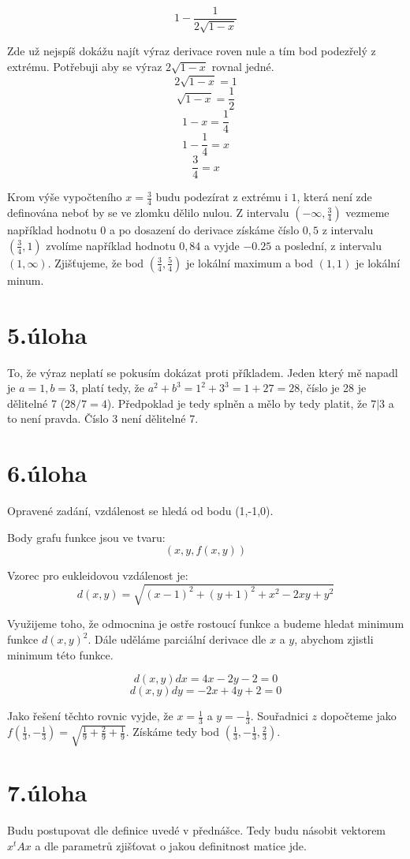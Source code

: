 \documentclass[a4paper, 11pt]{article}
\begin{document}
   $$1-\frac{1}{2\sqrt{1-x}}$$
   
   Zde už nejspíš dokážu najít výraz derivace roven nule a tím bod podezřelý z extrému. Potřebuji aby se výraz $2\sqrt{1-x}$ rovnal jedné.
   $$2\sqrt{1-x} = 1$$
   $$\sqrt{1-x} = \frac{1}{2}$$
   $$ 1-x = \frac{1}{4}$$
   $$1-\frac{1}{4} = x$$
   $$\frac{3}{4} = x$$
   
   Krom výše vypočteního $x = \frac{3}{4}$ budu podezírat z extrému  i $1$, která není zde definována nebo\v{t} by se ve zlomku dělilo nulou.
   Z intervalu $(-\infty,\frac{3}{4})$ vezmeme například hodnotu $0$ a po dosazení do derivace získáme číslo $0,5$ z intervalu $(\frac{3}{4},1)$ 
   zvolíme například hodnotu $0,84$ a vyjde $-0.25$ a poslední, z intervalu $(1,\infty)$. Zjiš\v{t}ujeme, že bod $(\frac{3}{4},\frac{5}{4})$ je lokální
   maximum a bod $(1,1)$ je lokální minum.
   
 \section*{5.úloha}
  To, že výraz neplatí se pokusím dokázat proti příkladem. Jeden který mě napadl je $a = 1, b = 3$, platí tedy, že $a^2 + b^3 = 1^2 + 3^3 = 1 + 27 = 28$,
  číslo je 28 je dělitelné 7 ($28/7 = 4$). Předpoklad je tedy splněn a mělo by tedy platit, že $7|3$ a to není pravda. Číslo 3 není dělitelné 7.
  
 \section*{6.úloha}
  Opravené zadání, vzdálenost se hledá od bodu (1,-1,0).
  
  Body grafu funkce jsou ve tvaru:
  $$(x,y,f(x,y))$$
  
  Vzorec pro eukleidovou vzdálenost je:
  $$d(x,y) = \sqrt{(x-1)^2+(y+1)^2+x^2-2xy+y^2}$$
  
  Využijeme toho, že odmocnina je ostře rostoucí funkce a budeme hledat minimum funkce $d(x,y)^2$. 
  Dále uděláme parciální derivace dle $x$ a $y$, abychom zjistli minimum této funkce.
  
  $$d(x,y)dx = 4x-2y-2 = 0$$
  $$d(x,y)dy = -2x+4y+2 = 0$$
  
  Jako řešení těchto rovnic vyjde, že $x = \frac{1}{3}$ a $y = -\frac{1}{3}$.
  Souřadnici $z$ dopočteme jako $f(\frac{1}{3},-\frac{1}{3}) = \sqrt{\frac{1}{9}+\frac{2}{9}+\frac{1}{9}}$. Získáme tedy bod $(\frac{1}{3},-\frac{1}{3},\frac{2}{3})$.
  
  \section{7.úloha}
  Budu postupovat dle definice uvedé v přednášce. Tedy budu násobit vektorem $x^tAx$ a dle parametrů zjiš\v{t}ovat o jakou definitnost matice jde.
  
\end{document}
